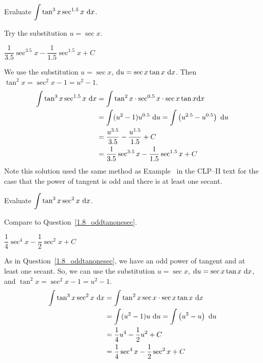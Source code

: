 \begin{question}\label{1.8_oddtanonesec}
Evaluate $\displaystyle\int \tan^3 x \sec^{1.5} x ~\mathrm{d}x$.
\end{question}
\begin{hint}
Try the substitution $u=\sec x$.
\end{hint}
\begin{answer}
$\dfrac{1}{3.5}\sec^{3.5}x - \dfrac{1}{1.5}\sec^{1.5}x+C$
\end{answer}
\begin{solution}
We use the substitution $u=\sec x$, $\mathrm{d}u = \sec x \tan x~\mathrm{d}x$. Then $\tan^2 x = \sec^2 x - 1 = u^2-1$.
\begin{align*}
\int \tan^3 x \sec^{1.5} x ~\mathrm{d}x &= \int \tan^2 x \cdot \sec^{0.5}x \cdot \sec x \tan x \mathrm{d}x\\
&=\int(u^2-1)u^{0.5}~\mathrm{d}u = \int \left(u^{2.5} - u^{0.5}\right)~\mathrm{d}u\\
&=\frac{u^{3.5}}{3.5} - \frac{u^{1.5}}{1.5}+C\\
&=\frac{1}{3.5}\sec^{3.5}x - \frac{1}{1.5}\sec^{1.5}x+C
\end{align*}
Note this solution used the same method as Example~  in the CLP--II text for the case that the power of tangent is odd and there is at least one secant.
\end{solution}





\begin{question}\label{1.8_oddtanonesec2}
Evaluate $\displaystyle\int \tan^3x\sec^2x~\mathrm{d}x$.
\end{question}
\begin{hint}
Compare to Question~\ref{1.8_oddtanonesec}.
\end{hint}
\begin{answer}
$\dfrac{1}{4}\sec^4 x - \dfrac{1}{2}\sec^2 x +C$
\end{answer}
\begin{solution}
As in Question~\ref{1.8_oddtanonesec}, we have an odd power of tangent and at least one secant. So, we can use the substitution $u=\sec x$, $\mathrm{d}u=\sec x \tan x~\mathrm{d}x$, and $\tan^2 x = \sec^2 x -1=u^2-1$.
\begin{align*}
\int \tan^3x\sec^2x~\mathrm{d}x&=\int \tan^2 x \sec x \cdot \sec x \tan x~\mathrm{d}x\\
&=\int(u^2-1)u~\mathrm{d}u = \int \left(u^3-u\right)~\mathrm{d}u\\
&=\frac{1}{4}u^4 - \frac{1}{2}u^2+C\\
&=\frac{1}{4}\sec^4 x - \frac{1}{2}\sec^2 x +C
\end{align*}
\end{solution}

